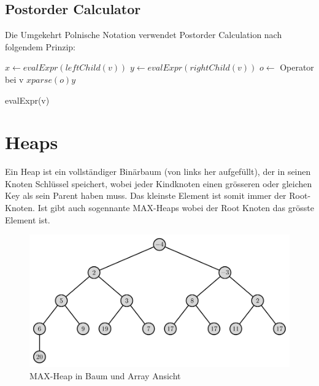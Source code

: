\subsection{Postorder Calculator}
Die Umgekehrt Polnische Notation verwendet Postorder Calculation nach folgendem Prinzip:
\begin{algorithm}
\begin{algorithmic}[1]
	\ELSE
		\STATE $ x \gets  evalExpr(leftChild(v))$
		\STATE $ y \gets  evalExpr(rightChild(v))$
		\STATE $ o \gets  $ Operator bei v
		\RETURN $x parse(o) y$
	\ENDIF
\end{algorithmic}
\caption{evalExpr(v)}
\end{algorithm}

\section{Heaps}
Ein Heap ist ein vollständiger Binärbaum (von links her aufgefüllt), der in seinen Knoten Schlüssel speichert, wobei jeder Kindknoten einen grösseren oder gleichen Key als sein Parent haben muss. Das kleinste Element ist somit immer der Root-Knoten. Ist gibt auch sogennante MAX-Heaps wobei der Root Knoten das grösste Element ist.

\begin{figure}[h!]
\centering
\includegraphics[width=0.5\linewidth]{images/heap}
\caption{MAX-Heap in Baum und Array Ansicht}
\end{figure}



